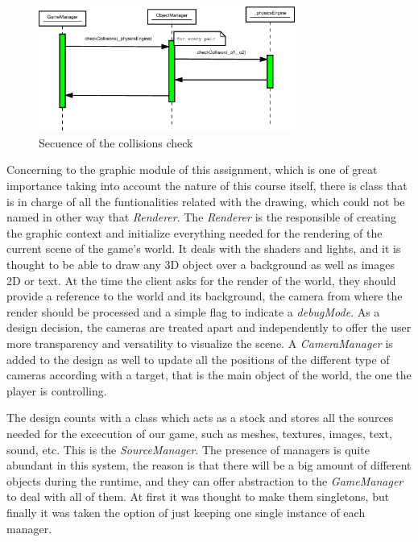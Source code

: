 \documentclass[]{article}
\begin{document}
\begin{figure}[h]
\begin{center}
\includegraphics[width=0.75\textwidth]{images/physicsEngineSec.eps}
\caption{Secuence of the collisions check}
\label{fig:pesec}
\end{center}
\end{figure}

Concerning to the graphic module of this assignment, which is one of great importance taking into account the nature of this course itself, there is class that is in charge of all the funtionalities
related with the drawing, which could not be named in other way that \emph{Renderer}. The \emph{Renderer} is the responsible of creating the graphic context and initialize everything needed for the
rendering of the current scene of the game's world. It deals with the shaders and lights, and it is thought to be able to draw any 3D object over a background as well as images 2D or text. At the time 
the client asks for the render of the world, they should provide a reference to the world and its background, the camera from where the render should be processed and a simple flag to indicate a \emph{debugMode}.
As a design decision, the cameras are treated apart and independently to offer the user more transparency and versatility to visualize the scene. A \emph{CameraManager} is added to the design as well to
update all the positions of the different type of cameras according with a target, that is the main object of the world, the one the player is controlling.

The design counts with a class which acts as a stock and stores all the sources needed for the excecution of our game, such as meshes, textures, images, text, sound, etc. This is the 
\emph{SourceManager}. The presence of managers is quite abundant in this system, the reason is that there will be a big amount of different objects during the runtime, and they can offer abstraction
to the \emph{GameManager} to deal with all of them. At first it was thought to make them singletons, but finally it was taken the option of just keeping one single instance of each manager.
\end{document}
